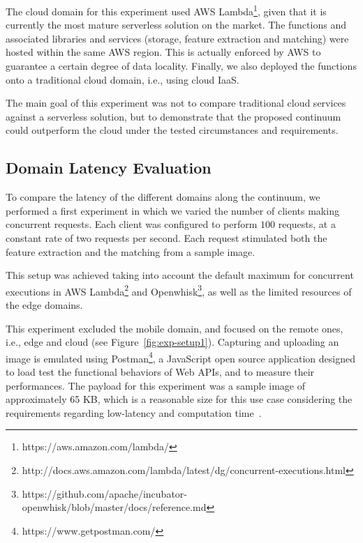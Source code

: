 The cloud domain for this experiment used AWS Lambda\footnote{https://aws.amazon.com/lambda/}, given that it is currently the most mature serverless solution on the market. The functions and associated libraries and services (storage, feature extraction and matching) were hosted within the same AWS region. This is actually enforced by AWS to guarantee a certain degree of data locality. Finally, we also deployed the functions onto a traditional cloud domain, i.e., using cloud IaaS. 

The main goal of this experiment was not to compare traditional cloud services against a serverless solution, but to demonstrate that the proposed continuum could outperform the cloud under the tested circumstances and requirements.


\subsection{Domain Latency Evaluation} 

To compare the latency of the different domains along the continuum, we performed a first experiment in which we varied the number of clients making concurrent requests. Each client was configured to perform $100$ requests, at a constant rate of two requests per second. Each request stimulated both the feature extraction and the matching from a sample image. 

This setup was achieved taking into account the default maximum for concurrent executions in AWS Lambda\footnote{http://docs.aws.amazon.com/lambda/latest/dg/concurrent-executions.html} and Openwhisk\footnote{https://github.com/apache/incubator-openwhisk/blob/master/docs/reference.md}, as well as the limited resources of the edge domains. 

This experiment excluded the mobile domain, and focused on the remote ones, i.e., edge and cloud (see Figure~\ref{fig:exp-setup1}). Capturing and uploading an image is emulated using Postman\footnote{https://www.getpostman.com/}, a JavaScript open source application designed to load test the functional behaviors of Web APIs, and to measure their performances. The  payload for this experiment was a sample image of approximately 65 KB, which is a reasonable size for this use case considering the requirements regarding low-latency and computation time~\cite{rodriguez16mobile}. 


